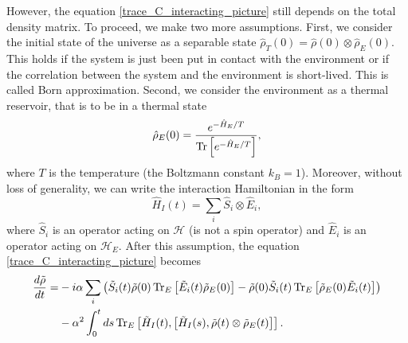 However, the equation \eqref{trace_C_interacting_picture} still depends on the total density matrix. To proceed, we make two more assumptions. First, we consider the initial state of the universe as a separable state $\hat\rho_T(0)=\hat\rho(0)\otimes \hat\rho_E(0)$. This holds if the system is just been put in contact with the environment or if the correlation between the system and the environment is short-lived. This is called Born approximation. 
Second, we consider the environment as a thermal reservoir, that is to be in a thermal state 
\begin{equation}
    \hat\rho_E(0) = \frac{e^{-\hat H_E/T}}{\operatorname{Tr}\left[e^{-\hat H_E/T}\right]},
\end{equation}
where $T$ is the temperature (the Boltzmann constant $k_B = 1$).
Moreover, without loss of generality, we can write the interaction Hamiltonian in the form
\begin{equation}\label{interacting_Hamiltonian}
    \hat H_I(t) = \sum_i \hat S_i\otimes \hat E_i,
\end{equation}
where $\hat S_i$ is an operator acting on $\mathcal{H}$ (is not a spin operator) and $\hat E_i$ is an operator acting on $\mathcal{H}_E$. After this assumption, the equation \eqref{trace_C_interacting_picture} becomes
\begin{equation}
    \begin{split}
        \frac{d\tilde\rho}{dt} =&-i\alpha\sum_i\left(\tilde S_i(t)\tilde \rho(0)\operatorname{Tr}_E\left[\tilde E_i(t)\tilde\rho_E(0)\right] - \tilde \rho(0)\tilde S_i(t)\operatorname{Tr}_E\left[\tilde\rho_E(0)\tilde E_i(t)\right]\right) \\ 
        &-\alpha^2 \int_{0}^{t}ds \operatorname{Tr}_E\left[\tilde H_I(t),\left[\tilde H_I(s),\tilde\rho(t)\otimes\tilde\rho_E(t)\right]\right].
    \end{split}
\end{equation}

